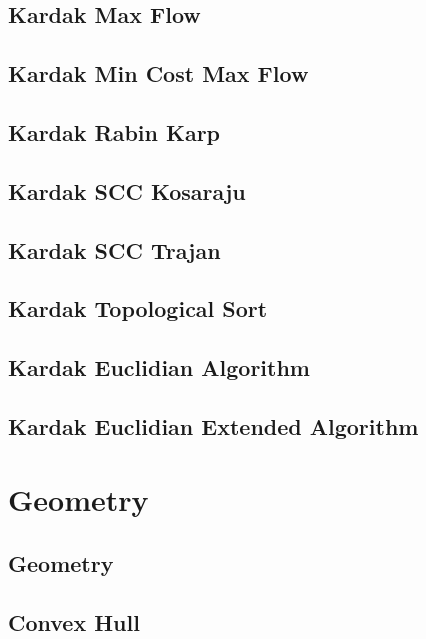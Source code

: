 \documentclass[a4paper,landscape]{article}
\begin{document}
\begin{multicols}{2}
\subsection{Kardak Max Flow}
	
\subsection{Kardak Min Cost Max Flow}
	
\subsection{Kardak Rabin Karp}
	
\subsection{Kardak SCC Kosaraju}
	
\subsection{Kardak SCC Trajan}
	
\subsection{Kardak Topological Sort}
	
\subsection{Kardak Euclidian Algorithm}
	
\subsection{Kardak Euclidian Extended Algorithm}
	

\section{Geometry}
\subsection{Geometry}
	
\subsection{Convex Hull}
    

\end{multicols}
\end{document}
